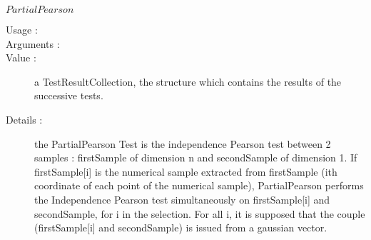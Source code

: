 \begin{description}
\begin{description}
  \item $PartialPearson$
    \begin{description}
    \item[Usage :] \rule{0pt}{1em}
    \item[Arguments :] \rule{0pt}{1em}
    \item[Value :]  a TestResultCollection, the structure which contains the results of the successive tests.
    \item[Details :] the PartialPearson Test is the independence Pearson test between 2 samples : firstSample of dimension n and secondSample of dimension 1. If firstSample[i] is the numerical sample extracted from firstSample (ith coordinate of each point of the numerical sample), PartialPearson performs the Independence Pearson test simultaneously on firstSample[i] and secondSample, for i in the selection. For all i, it is supposed that the couple (firstSample[i] and secondSample) is issued from a gaussian  vector.
    \end{description}
    \bigskip


\end{description}
\end{description}
